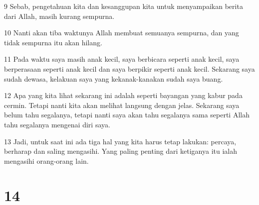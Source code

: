 \par 9 Sebab, pengetahuan kita dan kesanggupan kita untuk menyampaikan berita dari Allah, masih kurang sempurna.
\par 10 Nanti akan tiba waktunya Allah membuat semuanya sempurna, dan yang tidak sempurna itu akan hilang.
\par 11 Pada waktu saya masih anak kecil, saya berbicara seperti anak kecil, saya berperasaan seperti anak kecil dan saya berpikir seperti anak kecil. Sekarang saya sudah dewasa, kelakuan saya yang kekanak-kanakan sudah saya buang.
\par 12 Apa yang kita lihat sekarang ini adalah seperti bayangan yang kabur pada cermin. Tetapi nanti kita akan melihat langsung dengan jelas. Sekarang saya belum tahu segalanya, tetapi nanti saya akan tahu segalanya sama seperti Allah tahu segalanya mengenai diri saya.
\par 13 Jadi, untuk saat ini ada tiga hal yang kita harus tetap lakukan: percaya, berharap dan saling mengasihi. Yang paling penting dari ketiganya itu ialah mengasihi orang-orang lain.

\chapter{14}


